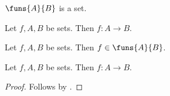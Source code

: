 \begin{signature}\label{funs}
    $\funs{A}{B}$ is a set.
\end{signature}

\begin{axiom}\label{set_map_arrow}
    Let $f,A,B$ be sets.
    Then $f:A\to B$.
\end{axiom}

\begin{axiom}\label{set_map_expanded}
    Let $f,A,B$ be sets.
    Then $f\in\funs{A}{B}$.
\end{axiom}

\begin{proposition}\label{set_map_backend}
    Let $f,A,B$ be sets.
    Then $f:A\to B$.
\end{proposition}
\begin{proof}
    Follows by .
\end{proof}
